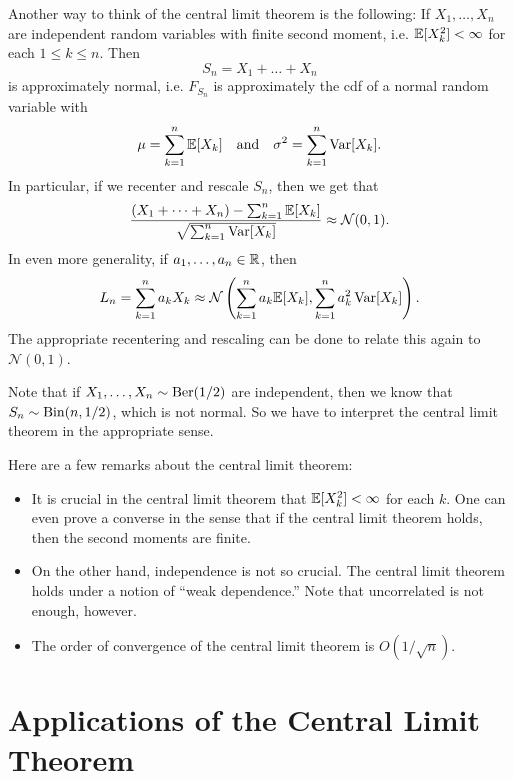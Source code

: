 \begin{remark}
  Another way to think of the central limit theorem
  is the following: If $X_1, \dots, X_n$
  are independent random variables with
  finite second moment, i.e.
  $\mathbb{E}[X_k^2] < \infty$ for each $1 \le k \le n$.
  Then
  \[
    S_n = X_1 + \dots + X_n
  \]
  is approximately normal, i.e.
  $F_{S_n}$ is approximately the cdf of a normal
  random variable with
  \[
    \mu = \sum_{k = 1}^n \mathbb{E}[X_k]
    \quad \text{and} \quad
    \sigma^2 = \sum_{k = 1}^n \operatorname{Var}[X_k].
  \]
  In particular, if we recenter and rescale
  $S_n$, then we get that
  \[
    \frac{(X_1 + \dots + X_n) - \sum_{k = 1}^n \mathbb{E}[X_k]}{\sqrt{\sum_{k = 1}^n \operatorname{Var}[X_k]}}
    \approx \mathcal{N}(0, 1).
  \]
  In even more generality, if
  $a_1, \dots, a_n \in \mathbb{R}$, then
  \[
    L_n = \sum_{k = 1}^n a_k X_k
    \approx \mathcal{N}\left(\sum_{k = 1}^n a_k \mathbb{E}[X_k], \sum_{k = 1}^n a_k^2 \operatorname{Var}[X_k]\right).
  \]
  The appropriate recentering and rescaling can be
  done to relate this again to $\mathcal{N}(0, 1)$.
\end{remark}

\begin{remark}
  Note that if $X_1, \dots, X_n \sim \operatorname{Ber}(1 / 2)$
  are independent, then we know that
  $S_n \sim \operatorname{Bin}(n, 1 / 2)$, which is not normal.
  So we have to interpret the central limit theorem
  in the appropriate sense.
\end{remark}

\begin{remark}
  Here are a few remarks about the central limit
  theorem:
  \begin{itemize}
    \item It is crucial in the central limit theorem
      that
      $\mathbb{E}[X_k^2] < \infty$ for each $k$. One can even
      prove a converse in the sense that if the
      central limit theorem holds, then the
      second moments are finite.
    \item On the other hand, independence is
      not so crucial. The central limit theorem
      holds under a notion of ``weak dependence.''
      Note that uncorrelated is not enough, however.
    \item The order of convergence of the
      central limit theorem is
      $O(1 / \sqrt{n})$.
  \end{itemize}
\end{remark}

\section{Applications of the Central Limit Theorem}


